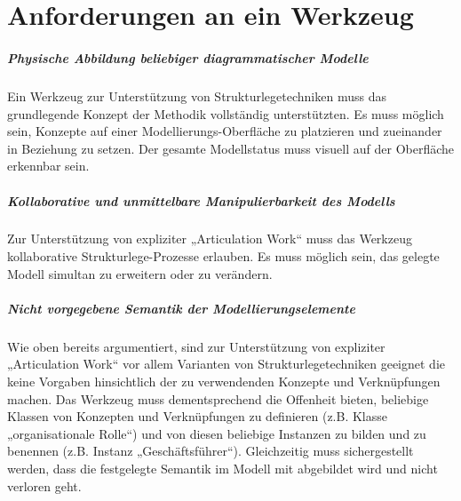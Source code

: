 \chapter{Anforderungen an ein Werkzeug} %
\label{cha:anforderungen}

\paragraph{Physische Abbildung beliebiger diagrammatischer Modelle} %
\label{par:physische_abbildung_legen_beliebiger_diagrammatischer_modelle}

Ein Werkzeug zur Unterstützung von Strukturlegetechniken muss das grundlegende Konzept der Methodik vollständig unterstützten. Es muss möglich sein, Konzepte auf einer Modellierungs-Oberfläche zu platzieren und zueinander in Beziehung zu setzen. Der gesamte Modellstatus muss visuell auf der Oberfläche erkennbar sein.


\paragraph{Kollaborative und unmittelbare Manipulierbarkeit des Modells} %
\label{par:kollaborative_und_unmittelbare_manipulierbarkeit_des_modells}

Zur Unterstützung von expliziter „Articulation Work“ muss das Werkzeug kollaborative Strukturlege-Prozesse erlauben. Es muss möglich sein, das gelegte Modell simultan zu erweitern oder zu verändern.


\paragraph{Nicht vorgegebene Semantik der Modellierungselemente} %
\label{par:nicht_vorgegebene_semantik_der_modellierungselemente}

Wie oben bereits argumentiert, sind zur Unterstützung von expliziter „Articulation Work“ vor allem Varianten von Strukturlegetechniken geeignet die keine Vorgaben hinsichtlich der zu verwendenden Konzepte und Verknüpfungen machen. Das Werkzeug muss dementsprechend die Offenheit bieten, beliebige Klassen von Konzepten und Verknüpfungen zu definieren (z.B. Klasse „organisationale Rolle“) und von diesen beliebige Instanzen zu bilden und zu benennen (z.B. Instanz „Geschäftsführer“). Gleichzeitig muss sichergestellt werden, dass die festgelegte Semantik im Modell mit abgebildet wird und nicht verloren geht.

